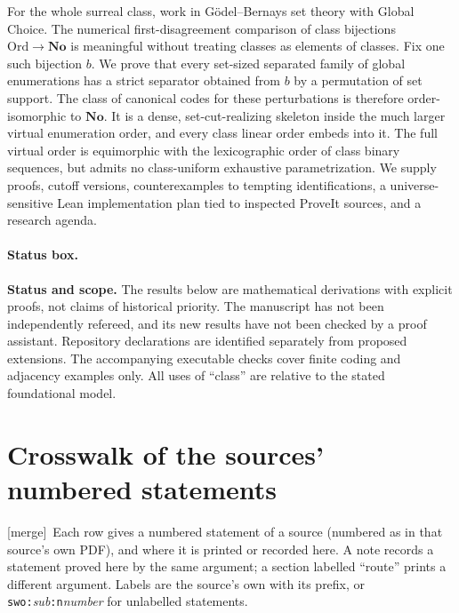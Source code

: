 \documentclass[11pt]{article}
\theoremstyle{definition}
\theoremstyle{remark}
\newcommand{\No}{\mathbf{No}}
\newcommand{\Ord}{\mathrm{Ord}}
\newcommand{\code}[1]{\texttt{\small #1}}
\newcommand{\merge}{\textsf{[merge]}}
\begin{document}
For the whole surreal class, work in G\"odel--Bernays set theory with
Global Choice. The numerical first-disagreement comparison of class
bijections $\Ord\to\No$ is meaningful without treating classes as elements
of classes. Fix one such bijection $b$. We prove that every set-sized
separated family of global enumerations has a strict separator obtained
from $b$ by a permutation of set support. The class of canonical codes for
these perturbations is therefore order-isomorphic to $\No$. It is a dense,
set-cut-realizing skeleton inside the much larger virtual enumeration
order, and every class linear order embeds into it. The full virtual order
is equimorphic with the lexicographic order of class binary sequences, but
admits no class-uniform exhaustive parametrization. We supply proofs,
cutoff versions, counterexamples to tempting identifications, a
universe-sensitive Lean implementation plan tied to inspected ProveIt
sources, and a research agenda.


\paragraph{Status box.}

\begin{resultbox}
\textbf{Status and scope.} The results below are mathematical derivations
with explicit proofs, not claims of historical priority. The manuscript
has not been independently refereed, and its new results have not been
checked by a proof assistant. Repository declarations are identified
separately from proposed extensions. The accompanying executable checks
cover finite coding and adjacency examples only. All uses of ``class''
are relative to the stated foundational model.
\end{resultbox}

\section{Crosswalk of the sources' numbered statements}\label{swo:app:crosswalk}

\merge\ Each row gives a numbered statement of a source (numbered as in that
source's own PDF), and where it is printed or recorded here. A note records a
statement proved here by the same argument; a section labelled ``route''
prints a different argument. Labels are the source's own with its prefix, or
\code{swo:}\emph{sub}\code{:n}\emph{number} for unlabelled statements.
\end{document}
